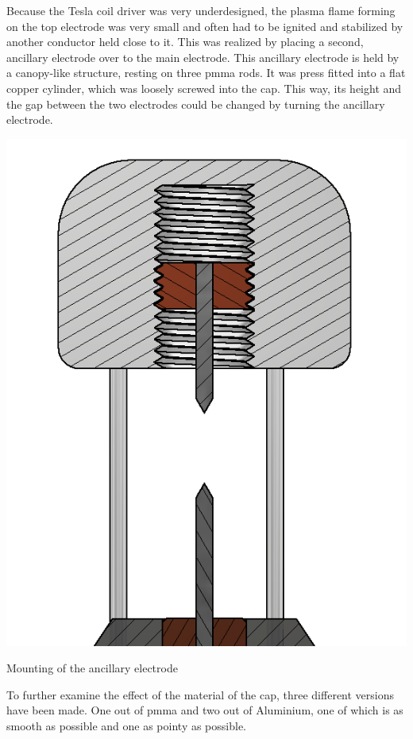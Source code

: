 Because the Tesla coil driver was very underdesigned, the plasma flame forming on the top electrode was very small and often had to be ignited and stabilized by another conductor held close to it. This was realized by placing a second, ancillary electrode over to the main electrode. This ancillary electrode is held by a canopy-like structure, resting on three \gls{pmma} rods. It was press fitted into a flat copper cylinder, which was loosely screwed into the cap. This way, its height and the gap between the two electrodes could be changed by turning the ancillary electrode. 

\begin{marginfigure}[-3cm]
    \centering
    \includegraphics[width=\textwidth]{kassandra/resources/mirGehtsSuperDanke.png}
    \caption{Mounting of the ancillary electrode}
    \label{fig:ancillary-electrode}
\end{marginfigure}

To further examine the effect of the material of the cap, three different versions have been made. One out of \gls{pmma} and two out of Aluminium, one of which is as smooth as possible and one as pointy as possible.

